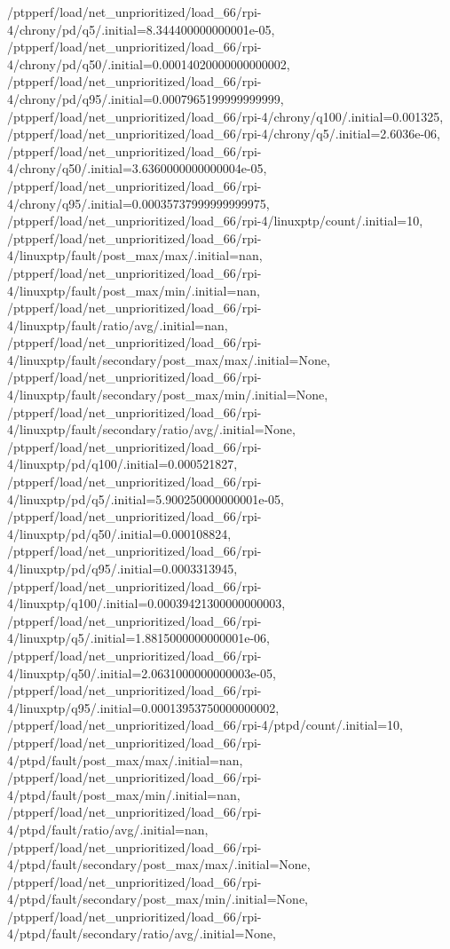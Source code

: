 {    /ptpperf/load/net_unprioritized/load_66/rpi-4/chrony/pd/q5/.initial=8.344400000000001e-05,
    /ptpperf/load/net_unprioritized/load_66/rpi-4/chrony/pd/q50/.initial=0.00014020000000000002,
    /ptpperf/load/net_unprioritized/load_66/rpi-4/chrony/pd/q95/.initial=0.0007965199999999999,
    /ptpperf/load/net_unprioritized/load_66/rpi-4/chrony/q100/.initial=0.001325,
    /ptpperf/load/net_unprioritized/load_66/rpi-4/chrony/q5/.initial=2.6036e-06,
    /ptpperf/load/net_unprioritized/load_66/rpi-4/chrony/q50/.initial=3.6360000000000004e-05,
    /ptpperf/load/net_unprioritized/load_66/rpi-4/chrony/q95/.initial=0.00035737999999999975,
    /ptpperf/load/net_unprioritized/load_66/rpi-4/linuxptp/count/.initial=10,
    /ptpperf/load/net_unprioritized/load_66/rpi-4/linuxptp/fault/post_max/max/.initial=nan,
    /ptpperf/load/net_unprioritized/load_66/rpi-4/linuxptp/fault/post_max/min/.initial=nan,
    /ptpperf/load/net_unprioritized/load_66/rpi-4/linuxptp/fault/ratio/avg/.initial=nan,
    /ptpperf/load/net_unprioritized/load_66/rpi-4/linuxptp/fault/secondary/post_max/max/.initial=None,
    /ptpperf/load/net_unprioritized/load_66/rpi-4/linuxptp/fault/secondary/post_max/min/.initial=None,
    /ptpperf/load/net_unprioritized/load_66/rpi-4/linuxptp/fault/secondary/ratio/avg/.initial=None,
    /ptpperf/load/net_unprioritized/load_66/rpi-4/linuxptp/pd/q100/.initial=0.000521827,
    /ptpperf/load/net_unprioritized/load_66/rpi-4/linuxptp/pd/q5/.initial=5.900250000000001e-05,
    /ptpperf/load/net_unprioritized/load_66/rpi-4/linuxptp/pd/q50/.initial=0.000108824,
    /ptpperf/load/net_unprioritized/load_66/rpi-4/linuxptp/pd/q95/.initial=0.0003313945,
    /ptpperf/load/net_unprioritized/load_66/rpi-4/linuxptp/q100/.initial=0.00039421300000000003,
    /ptpperf/load/net_unprioritized/load_66/rpi-4/linuxptp/q5/.initial=1.8815000000000001e-06,
    /ptpperf/load/net_unprioritized/load_66/rpi-4/linuxptp/q50/.initial=2.0631000000000003e-05,
    /ptpperf/load/net_unprioritized/load_66/rpi-4/linuxptp/q95/.initial=0.00013953750000000002,
    /ptpperf/load/net_unprioritized/load_66/rpi-4/ptpd/count/.initial=10,
    /ptpperf/load/net_unprioritized/load_66/rpi-4/ptpd/fault/post_max/max/.initial=nan,
    /ptpperf/load/net_unprioritized/load_66/rpi-4/ptpd/fault/post_max/min/.initial=nan,
    /ptpperf/load/net_unprioritized/load_66/rpi-4/ptpd/fault/ratio/avg/.initial=nan,
    /ptpperf/load/net_unprioritized/load_66/rpi-4/ptpd/fault/secondary/post_max/max/.initial=None,
    /ptpperf/load/net_unprioritized/load_66/rpi-4/ptpd/fault/secondary/post_max/min/.initial=None,
    /ptpperf/load/net_unprioritized/load_66/rpi-4/ptpd/fault/secondary/ratio/avg/.initial=None,
}
